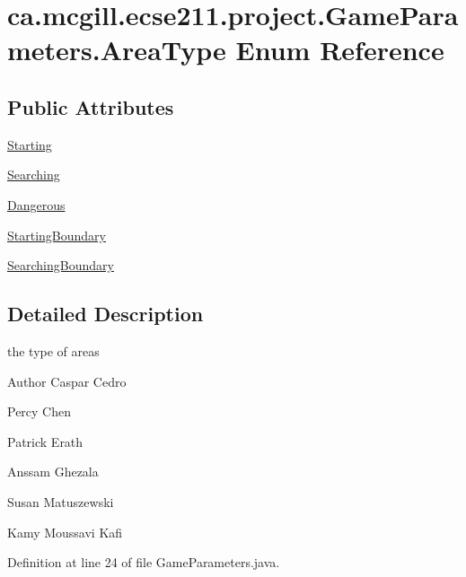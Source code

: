 \hypertarget{enumca_1_1mcgill_1_1ecse211_1_1project_1_1_game_parameters_1_1_area_type}{}\section{ca.\+mcgill.\+ecse211.\+project.\+Game\+Parameters.\+Area\+Type Enum Reference}
\label{enumca_1_1mcgill_1_1ecse211_1_1project_1_1_game_parameters_1_1_area_type}
\subsection*{Public Attributes}
\begin{DoxyCompactItemize}
\item 
\hyperlink{enumca_1_1mcgill_1_1ecse211_1_1project_1_1_game_parameters_1_1_area_type_a3e0e6dda84dcf0572039c349889217c5}{Starting}
\item 
\hyperlink{enumca_1_1mcgill_1_1ecse211_1_1project_1_1_game_parameters_1_1_area_type_a25564076fdd8880377fbd6eaf753456f}{Searching}
\item 
\hyperlink{enumca_1_1mcgill_1_1ecse211_1_1project_1_1_game_parameters_1_1_area_type_ac762256f8b33e7c93c162520a0349769}{Dangerous}
\item 
\hyperlink{enumca_1_1mcgill_1_1ecse211_1_1project_1_1_game_parameters_1_1_area_type_afd78c1184c6b82e22bb08ed39ae4e83b}{Starting\+Boundary}
\item 
\hyperlink{enumca_1_1mcgill_1_1ecse211_1_1project_1_1_game_parameters_1_1_area_type_a5a3aceb665ba97ac242e77955feed640}{Searching\+Boundary}
\end{DoxyCompactItemize}


\subsection{Detailed Description}
the type of areas \begin{DoxyAuthor}{Author}
Caspar Cedro 

Percy Chen 

Patrick Erath 

Anssam Ghezala 

Susan Matuszewski 

Kamy Moussavi Kafi 
\end{DoxyAuthor}


Definition at line 24 of file Game\+Parameters.\+java.



